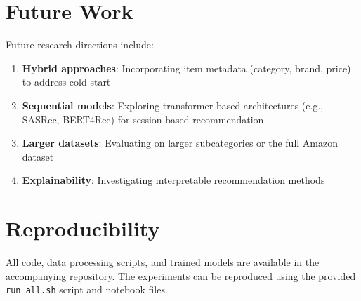\section{Future Work}

Future research directions include:
\begin{enumerate}
    \item \textbf{Hybrid approaches}: Incorporating item metadata (category, brand, price) to address cold-start
    \item \textbf{Sequential models}: Exploring transformer-based architectures (e.g., SASRec, BERT4Rec) for session-based recommendation
    \item \textbf{Larger datasets}: Evaluating on larger subcategories or the full Amazon dataset
    \item \textbf{Explainability}: Investigating interpretable recommendation methods
\end{enumerate}

\section{Reproducibility}

All code, data processing scripts, and trained models are available in the accompanying repository. The experiments can be reproduced using the provided \texttt{run\_all.sh} script and notebook files.